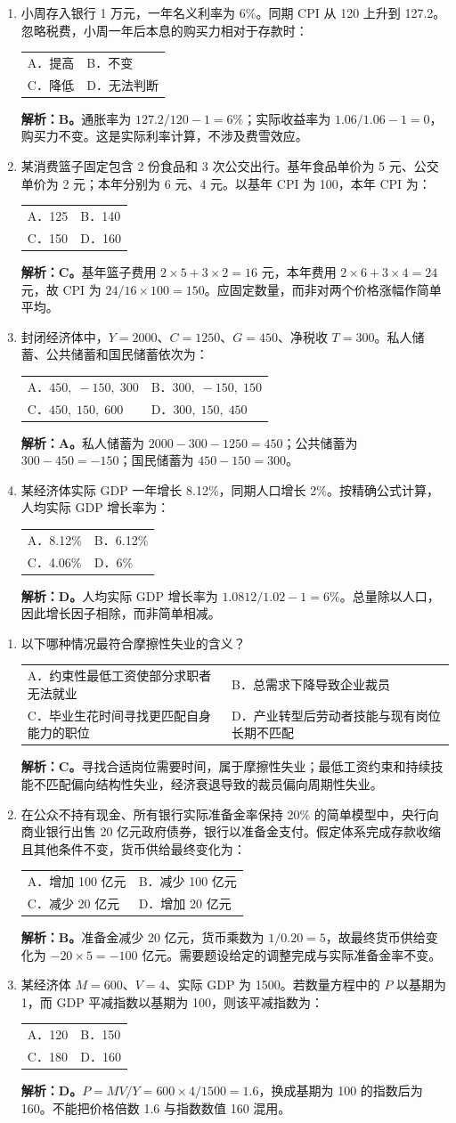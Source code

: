 \documentclass[UTF8,11pt,a4paper,fontset=fandol]{ctexart}
\makeatletter
\newcommand{\sect}[1]{\par\vspace{0.7em}{\large\bfseries #1}\par\vspace{0.6em}}
\newcommand{\choices}[4]{\par\nopagebreak\begin{tabularx}{\linewidth}{@{}XX@{}}A．#1&B．#2\\C．#3&D．#4\end{tabularx}\par}
\newcommand{\ans}[1]{\par\textbf{解析：}#1\par}
\makeatother
\begin{document}
\begin{enumerate}[label=\arabic*.,start=1,leftmargin=*,itemsep=1.05em]
\item 小周存入银行 1 万元，一年名义利率为 6\%。同期 CPI 从 120 上升到 127.2。忽略税费，小周一年后本息的购买力相对于存款时：
\choices{提高}{不变}{降低}{无法判断}
\ans{\textbf{B。}通胀率为 $127.2/120-1=6\%$；实际收益率为 $1.06/1.06-1=0$，购买力不变。这是实际利率计算，不涉及费雪效应。}
\item 某消费篮子固定包含 2 份食品和 3 次公交出行。基年食品单价为 5 元、公交单价为 2 元；本年分别为 6 元、4 元。以基年 CPI 为 100，本年 CPI 为：
\choices{125}{140}{150}{160}
\ans{\textbf{C。}基年篮子费用 $2\times5+3\times2=16$ 元，本年费用 $2\times6+3\times4=24$ 元，故 CPI 为 $24/16\times100=150$。应固定数量，而非对两个价格涨幅作简单平均。}
\item 封闭经济体中，$Y=2000$、$C=1250$、$G=450$、净税收 $T=300$。私人储蓄、公共储蓄和国民储蓄依次为：
\choices{$450,\;-150,\;300$}{$300,\;-150,\;150$}{$450,\;150,\;600$}{$300,\;150,\;450$}
\ans{\textbf{A。}私人储蓄为 $2000-300-1250=450$；公共储蓄为 $300-450=-150$；国民储蓄为 $450-150=300$。}
\item 某经济体实际 GDP 一年增长 8.12\%，同期人口增长 2\%。按精确公式计算，人均实际 GDP 增长率为：
\choices{8.12\%}{6.12\%}{4.06\%}{6\%}
\ans{\textbf{D。}人均实际 GDP 增长率为 $1.0812/1.02-1=6\%$。总量除以人口，因此增长因子相除，而非简单相减。}
\end{enumerate}
\newpage\sect{二、单选题解析（续）}
\begin{enumerate}[label=\arabic*.,start=5,leftmargin=*,itemsep=1.05em]
\item 以下哪种情况最符合摩擦性失业的含义？
\choices{约束性最低工资使部分求职者无法就业}{总需求下降导致企业裁员}{毕业生花时间寻找更匹配自身能力的职位}{产业转型后劳动者技能与现有岗位长期不匹配}
\ans{\textbf{C。}寻找合适岗位需要时间，属于摩擦性失业；最低工资约束和持续技能不匹配偏向结构性失业，经济衰退导致的裁员偏向周期性失业。}
\item 在公众不持有现金、所有银行实际准备金率保持 20\% 的简单模型中，央行向商业银行出售 20 亿元政府债券，银行以准备金支付。假定体系完成存款收缩且其他条件不变，货币供给最终变化为：
\choices{增加 100 亿元}{减少 100 亿元}{减少 20 亿元}{增加 20 亿元}
\ans{\textbf{B。}准备金减少 20 亿元，货币乘数为 $1/0.20=5$，故最终货币供给变化为 $-20\times5=-100$ 亿元。需要题设给定的调整完成与实际准备金率不变。}
\item 某经济体 $M=600$、$V=4$、实际 GDP 为 1500。若数量方程中的 $P$ 以基期为 1，而 GDP 平减指数以基期为 100，则该平减指数为：
\choices{120}{150}{180}{160}
\ans{\textbf{D。}$P=MV/Y=600\times4/1500=1.6$，换成基期为 100 的指数后为 160。不能把价格倍数 1.6 与指数数值 160 混用。}
\end{enumerate}
\end{document}
